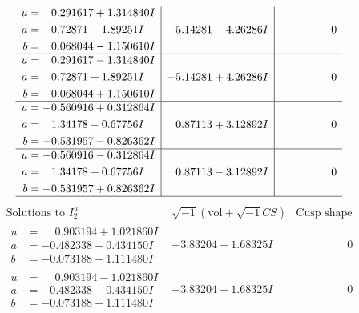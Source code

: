 \documentclass[1p]{elsarticle_modified}
\theoremstyle{definition}
\newcommand{\I}{\sqrt{-1}}
\begin{document}
$$\begin{array}{c|c|c}
\begin{aligned}
u &= \phantom{-}0.291617 + 1.314840 I \\
a &= \phantom{-}0.72871 - 1.89251 I \\
b &= \phantom{-}0.068044 - 1.150610 I\end{aligned}
 & -5.14281 - 4.26286 I & \phantom{-0.000000 } 0 \\ \hline\begin{aligned}
u &= \phantom{-}0.291617 - 1.314840 I \\
a &= \phantom{-}0.72871 + 1.89251 I \\
b &= \phantom{-}0.068044 + 1.150610 I\end{aligned}
 & -5.14281 + 4.26286 I & \phantom{-0.000000 } 0 \\ \hline\begin{aligned}
u &= -0.560916 + 0.312864 I \\
a &= \phantom{-}1.34178 - 0.67756 I \\
b &= -0.531957 - 0.826362 I\end{aligned}
 & \phantom{-}0.87113 + 3.12892 I & \phantom{-0.000000 } 0 \\ \hline\begin{aligned}
u &= -0.560916 - 0.312864 I \\
a &= \phantom{-}1.34178 + 0.67756 I \\
b &= -0.531957 + 0.826362 I\end{aligned}
 & \phantom{-}0.87113 - 3.12892 I & \phantom{-0.000000 } 0\\
 \hline 
 \end{array}$$\newpage$$\begin{array}{c|c|c}  
\text{Solutions to }I^u_{2}& \I (\text{vol} + \sqrt{-1}CS) & \text{Cusp shape}\\
 \hline 
\begin{aligned}
u &= \phantom{-}0.903194 + 1.021860 I \\
a &= -0.482338 + 0.434150 I \\
b &= -0.073188 + 1.111480 I\end{aligned}
 & -3.83204 - 1.68325 I & \phantom{-0.000000 } 0 \\ \hline\begin{aligned}
u &= \phantom{-}0.903194 - 1.021860 I \\
a &= -0.482338 - 0.434150 I \\
b &= -0.073188 - 1.111480 I\end{aligned}
 & -3.83204 + 1.68325 I & \phantom{-0.000000 } 0 \\ \hline\begin{aligned}

\end{aligned}
\end{array}$$
\end{document}
